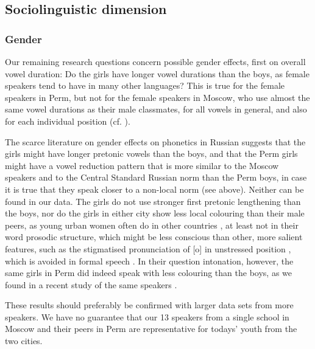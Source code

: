 \documentclass[output=paper]{langscibook}
\begin{document}
\subsection{Sociolinguistic dimension}
\label{sec:post:4.4}
\subsubsection{Gender}
\label{sec:post:4.4.1}
Our remaining research questions concern possible gender effects, first on overall vowel duration: Do the girls have longer vowel durations than the boys, as female speakers tend to have in many other languages? This is true for the female speakers in Perm, but not for the female speakers in Moscow, who use almost the same vowel durations as their male classmates, for all vowels in general, and also for each individual position (cf. ).



The scarce literature on gender effects on phonetics in Russian suggests that the girls might have longer pretonic vowels than the boys, and that the Perm girls might have a vowel reduction pattern that is more similar to the Moscow speakers and to the Central Standard Russian norm than the Perm boys, in case it is true that they speak closer to a non-local norm (see  above). Neither can be found in our data. The girls do not use stronger first pretonic lengthening than the boys, nor do the girls in either city show less local colouring than their male peers, as young urban women often do in other countries \citep{Labov2001}, at least not in their word prosodic structure, which might be less conscious than other, more salient features, such as the stigmatised pronunciation of [o] in unstressed position \citep{Andrews1995}, which is avoided in formal speech \citep{Erofeeva1993}. In their question intonation, however, the same girls in Perm did indeed speak with less colouring than the boys, as we found in a recent study of the same speakers \citep{RN1173}.



These results should preferably be confirmed with larger data sets from more speakers. We have no guarantee that our 13 speakers from a single school in Moscow and their peers in Perm are representative for todays' youth from the two cities.
\end{document}
